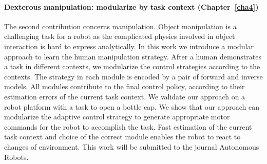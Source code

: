 
\paragraph{Dexterous manipulation: modularize by task context (Chapter~\ref{cha4})}
The second contribution concerns manipulation. Object manipulation is a challenging task for a robot as the complicated physics involved in object interaction is hard to express analytically. In this work we introduce a modular approach to learn the human manipulation strategy. After a human demonstrates a task in different contexts, we modularize the control strategies according to the contexts. The strategy in each module is encoded by a pair of forward and inverse models. All modules contribute to the final control policy, according to their estimation errors of the current task context. We validate our approach on a robot platform with a task to open a bottle cap. We show that our approach can modularize the adaptive control strategy to generate appropriate motor commands for the robot to accomplish the task. Fast estimation of the current task context and choice of the correct module enables the robot to react to changes of environment. This work will be submitted to the journal Autonomous Robots.


